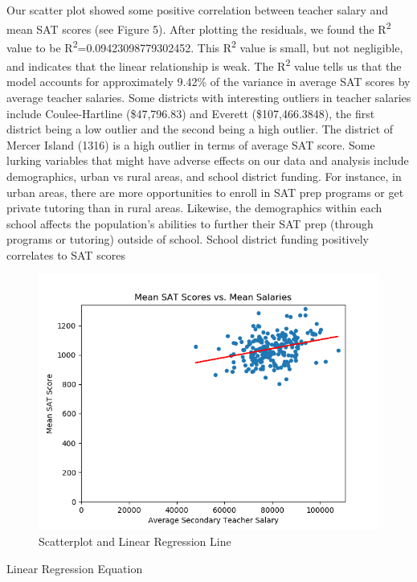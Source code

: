 \documentclass[11pt]{article} %
\begin{document}
Our scatter plot showed some positive correlation between teacher salary and mean SAT scores (see Figure 5). After plotting the residuals, we found the R\textsuperscript{2} value to be R\textsuperscript{2}=0.09423098779302452. This R\textsuperscript{2} value is small, but not negligible, and indicates that the linear relationship is weak. The R\textsuperscript{2} value tells us that the model accounts for approximately 9.42\% of the variance in average SAT scores by average teacher salaries. Some districts with interesting outliers in teacher salaries include Coulee-Hartline (\$47,796.83) and Everett (\$107,466.3848), the first district being a low outlier and the second being a high outlier. The district of Mercer Island (1316) is a high outlier in terms of average SAT score. Some lurking variables that might have adverse effects on our data and analysis include demographics, urban vs rural areas, and school district funding.  For instance, in urban areas, there are more opportunities to enroll in SAT prep programs or get private tutoring than in rural areas. Likewise, the demographics within each school affects the population’s abilities to further their SAT prep (through programs or tutoring) outside of school. School district funding positively correlates to SAT scores

\begin{figure}[H]
  \includegraphics[scale=0.3,center]{figure5.png}
  \caption{Scatterplot and Linear Regression Line}
  \label{fig:fig4}
\end{figure}

Linear Regression Equation
\end{document}
